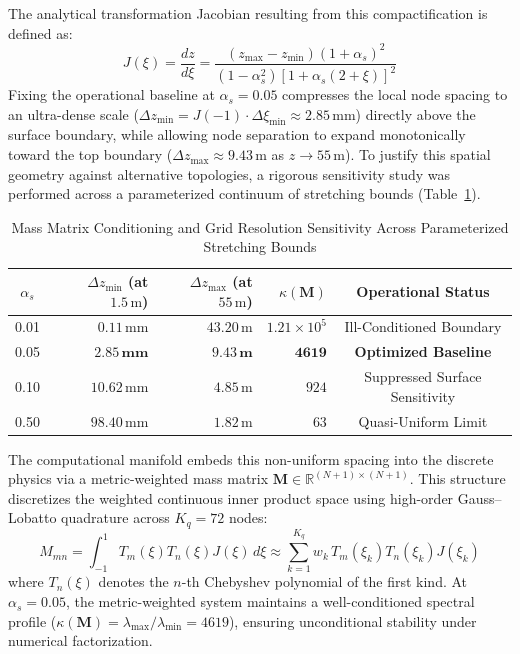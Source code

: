 The analytical transformation Jacobian resulting from this compactification is defined as:
\begin{equation}
J(\xi) = \frac{dz}{d\xi} = \frac{(z_{\max} - z_{\min})(1 + \alpha_s)^2}{(1 - \alpha_s^2) \left[1 + \alpha_s(2+\xi)\right]^2}
\label{eq:jacobian_stretched}
\end{equation}
Fixing the operational baseline at $\alpha_s = 0.05$ compresses the local node spacing to an ultra-dense scale ($\Delta z_{\min} = J(-1) \cdot \Delta \xi_{\min} \approx 2.85\,\text{mm}$) directly above the surface boundary, while allowing node separation to expand monotonically toward the top boundary ($\Delta z_{\max} \approx 9.43\,\text{m}$ as $z \rightarrow 55\,\text{m}$). To justify this spatial geometry against alternative topologies, a rigorous sensitivity study was performed across a parameterized continuum of stretching bounds (Table~\ref{tab:stretch_sensitivity}).

\begin{table}[h]
\centering
\caption{Mass Matrix Conditioning and Grid Resolution Sensitivity Across Parameterized Stretching Bounds}
\label{tab:stretch_sensitivity}
\begin{tabular}{c|rrrc}
\hline
$\alpha_s$ & $\Delta z_{\min}$ (at $1.5\,\text{m}$) & $\Delta z_{\max}$ (at $55\,\text{m}$) & $\kappa(\mathbf{M})$ & Operational Status \\
\hline
0.01 & $0.11\,\text{mm}$ & $43.20\,\text{m}$ & $1.21 \times 10^5$ & Ill-Conditioned Boundary \\
0.05 & $\mathbf{2.85\,\text{mm}}$ & $\mathbf{9.43\,\text{m}}$ & $\mathbf{4619}$ & \textbf{Optimized Baseline} \\
0.10 & $10.62\,\text{mm}$ & $4.85\,\text{m}$ & $924$ & Suppressed Surface Sensitivity \\
0.50 & $98.40\,\text{mm}$ & $1.82\,\text{m}$ & $63$ & Quasi-Uniform Limit \\
\hline
\end{tabular}
\end{table}

The computational manifold embeds this non-uniform spacing into the discrete physics via a metric-weighted mass matrix $\mathbf{M} \in \mathbb{R}^{(N+1) \times (N+1)}$. This structure discretizes the weighted continuous inner product space using high-order Gauss--Lobatto quadrature across $K_q = 72$ nodes:
\begin{equation}
M_{mn} = \int_{-1}^{1} T_m(\xi) T_n(\xi) J(\xi) \, d\xi \approx \sum_{k=1}^{K_q} w_k \, T_m(\xi_k) T_n(\xi_k) J(\xi_k)
\label{eq:mass_matrix_quad}
\end{equation}
where $T_n(\xi)$ denotes the $n$-th Chebyshev polynomial of the first kind. At $\alpha_s = 0.05$, the metric-weighted system maintains a well-conditioned spectral profile ($\kappa(\mathbf{M}) = \lambda_{\max}/\lambda_{\min} = 4619$), ensuring unconditional stability under numerical factorization.


